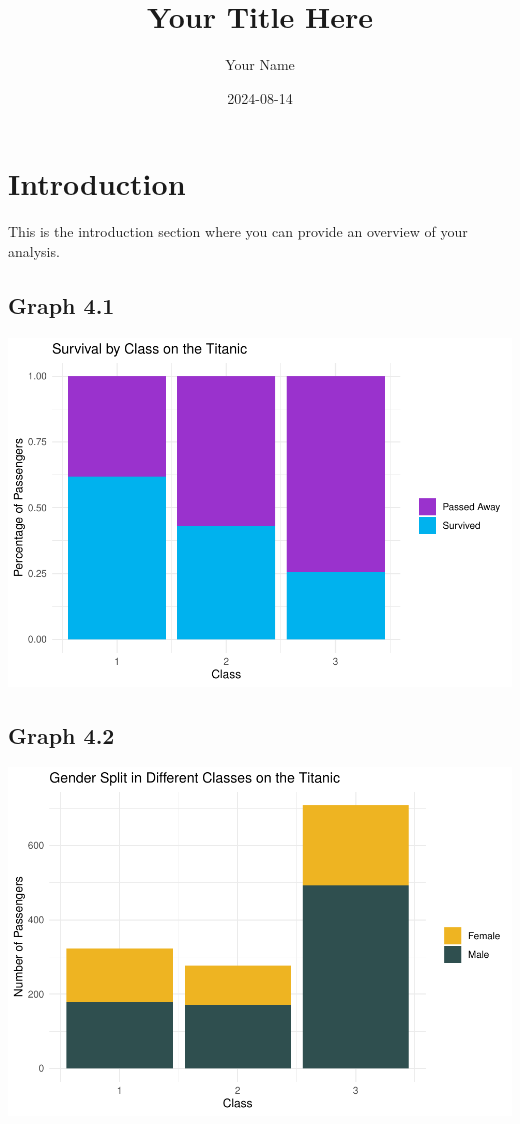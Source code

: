 \documentclass[
  11pt,
]{article}
\title{Your Title Here}
\author{Your Name}
\date{2024-08-14}
\begin{document}
\maketitle

\hypertarget{introduction}{%
\section{Introduction}\label{introduction}}

This is the introduction section where you can provide an overview of
your analysis.

\hypertarget{graph-4.1}{%
\subsection{Graph 4.1}\label{graph-4.1}}

\includegraphics{README_files/figure-latex/unnamed-chunk-2-1.pdf}

\hypertarget{graph-4.2}{%
\subsection{Graph 4.2}\label{graph-4.2}}

\includegraphics{README_files/figure-latex/unnamed-chunk-3-1.pdf}
\end{document}
